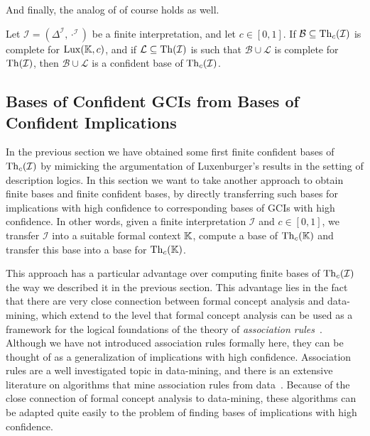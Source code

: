 And finally, the analog of  of course holds as well.

\begin{Corollary}
  \label{cor:weakened-luxenburger-base-for-gcis}
  Let $\mathcal{I} = (\Delta^{\mathcal{I}}, \cdot^{\mathcal{I}})$ be a finite
  interpretation, and let $c \in [0,1]$.  If $\mathcal{B} \subseteq \operatorname{Th}_c(\mathcal{I})$ is
  complete for $\operatorname{Lux}({\mathbb{K}}, c)$, and if $\mathcal{L} \subseteq \operatorname{Th}(\mathcal{I})$ is such
  that $\mathcal{B} \cup \mathcal{L}$ is complete for $\operatorname{Th}(\mathcal{I})$, then
  $\mathcal{B} \cup \mathcal{L}$ is a confident base of $\operatorname{Th}_c(\mathcal{I})$.
\end{Corollary}


\subsection{Bases of Confident GCIs from Bases of Confident Implications}
\label{sec:bases-confident-gcis}

In the previous section we have obtained some first finite confident bases of
$\operatorname{Th}_c(\mathcal{I})$ by mimicking the argumentation of Luxenburger's results in the
setting of description logics.  In this section we want to take another approach to obtain
finite bases and finite confident bases, by directly transferring such bases for
implications with high confidence to corresponding bases of GCIs with high confidence.  In
other words, given a finite interpretation $\mathcal{I}$ and $c \in [0,1]$, we transfer
$\mathcal{I}$ into a suitable formal context ${\mathbb{K}}$, compute a base of $\operatorname{Th}_c({\mathbb{K}})$
and transfer this base into a base for $\operatorname{Th}_c({\mathbb{K}})$.

This approach has a particular advantage over computing finite bases of
$\operatorname{Th}_c(\mathcal{I})$ the way we described it in the previous section.  This advantage lies
in the fact that there are very close connection between formal concept analysis and
data-mining, which extend to the level that formal concept analysis can be used as a
framework for the logical foundations of the theory of \emph{association
  rules}~\cite{arules:Zaki:1998}.  Although we have not introduced association rules
formally here, they can be thought of as a generalization of implications with high
confidence.  Association rules are a well investigated topic in data-mining, and there is
an extensive literature on algorithms that mine association rules from data~.  Because of the close connection of formal concept analysis to
data-mining, these algorithms can be adapted quite easily to the problem of finding bases
of implications with high confidence.

